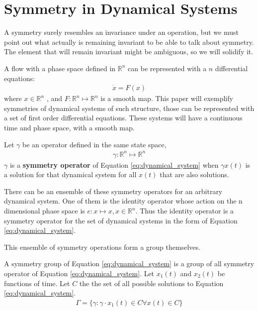 \section{Symmetry in Dynamical Systems}
A symmetry surely resembles an invariance under an operation, but we must point out what actually is remaining invariant to be able to talk about symmetry. The element that will remain invariant might be ambiguous, so we will solidify it.

A flow with a phase space defined in $\mathbb{R}^n$ can be represented with a $n$ differential equations:
\begin{align}
\label{eq:dynamical_system}
 \dot{x} = F(x)
\end{align}
where  $x\in \mathbb{R}^n$ , and $F:   \mathbb{R}^n \mapsto  \mathbb{R}^n$ is a smooth map. This paper  will exemplify symmetries of dynamical systems of such structure, those can be represented with a set of first order differential equations. These systems will have a continuous time and phase space, with a smooth map.


\begin{definition}
Let $ \gamma  $ be an operator defined in the same state space, 
\begin{align}
\label{eq:symmetry_operator}
 \gamma  :  \mathbb{R}^n \mapsto  \mathbb{R}^n 
\end{align}
$ \gamma  $ is a \textbf{symmetry operator} of Equation \ref{eq:dynamical_system}  when $ \gamma  x(t) $ is a solution for that dynamical system for all $x(t)$ that are also solutions.
\end{definition}

There can be an ensemble of these symmetry operators for an arbitrary dynamical system. One of them is the identity operator whose action on the n dimensional phase space is $e: x\mapsto x , x \in \mathbb{R}^n$. Thus the identity operator is a symmetry operator for the set of dynamical systems in the form of Equation \ref{eq:dynamical_system}. 

This ensemble of symmetry operations form a group themselves.

\begin{definition}
\label{symmetry group}
A symmetry group of Equation \ref{eq:dynamical_system} is a group of all symmetry operator of Equation \ref{eq:dynamical_system}.
Let $x_1(t)$ and $x_2(t)$ be functions of time.
Let $C$ the the set of all possible solutions to Equation \ref{eq:dynamical_system}. 
\begin{align}
\label{eq:symmetry_group}
\Gamma  = \{\gamma : \gamma \cdot x_1(t)\in C \forall x(t) \in C \}
\end{align}
\end{definition}

